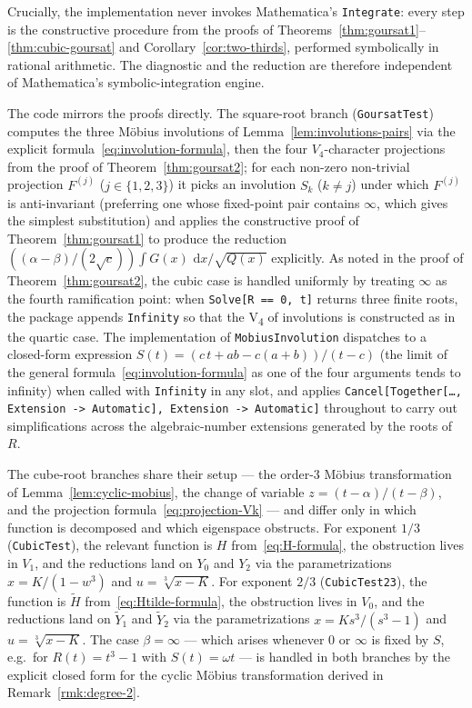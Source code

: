 \documentclass[11pt,a4paper]{article}
\theoremstyle{plain}
\theoremstyle{definition}
\theoremstyle{remark}
\renewcommand{\d}{\,\mathrm{d}}
\begin{document}
Crucially, the implementation never invokes Mathematica's \texttt{Integrate}: every step is the constructive procedure from the proofs of Theorems~\ref{thm:goursat1}--\ref{thm:cubic-goursat} and Corollary~\ref{cor:two-thirds}, performed symbolically in rational arithmetic. The diagnostic and the reduction are therefore independent of Mathematica's symbolic-integration engine.

The code mirrors the proofs directly. The square-root branch (\texttt{GoursatTest}) computes the three M\"obius involutions of Lemma~\ref{lem:involutions-pairs} via the explicit formula~\eqref{eq:involution-formula}, then the four $V_4$-character projections from the proof of Theorem~\ref{thm:goursat2}; for each non-zero non-trivial projection $F^{(j)}$ ($j\in\{1,2,3\}$) it picks an involution $S_k$ ($k\neq j$) under which $F^{(j)}$ is anti-invariant (preferring one whose fixed-point pair contains $\infty$, which gives the simplest substitution) and applies the constructive proof of Theorem~\ref{thm:goursat1} to produce the reduction $((\alpha-\beta)/(2\sqrt{c}))\int G(x)\,\d x/\sqrt{Q(x)}$ explicitly. As noted in the proof of Theorem~\ref{thm:goursat2}, the cubic case is handled uniformly by treating $\infty$ as the fourth ramification point: when \texttt{Solve[R == 0, t]} returns three finite roots, the package appends \texttt{Infinity} so that the V\textsubscript{4} of involutions is constructed as in the quartic case. The implementation of \texttt{MobiusInvolution} dispatches to a closed-form expression $S(t) = (c\,t + ab - c(a+b))/(t-c)$ (the limit of the general formula~\eqref{eq:involution-formula} as one of the four arguments tends to infinity) when called with \texttt{Infinity} in any slot, and applies \texttt{Cancel[Together[\dots, Extension -> Automatic], Extension -> Automatic]} throughout to carry out simplifications across the algebraic-number extensions generated by the roots of $R$.

The cube-root branches share their setup --- the order-$3$ M\"obius transformation of Lemma~\ref{lem:cyclic-mobius}, the change of variable $z=(t-\alpha)/(t-\beta)$, and the projection formula~\eqref{eq:projection-Vk} --- and differ only in which function is decomposed and which eigenspace obstructs. For exponent $1/3$ (\texttt{CubicTest}), the relevant function is $H$ from~\eqref{eq:H-formula}, the obstruction lives in $V_1$, and the reductions land on $Y_0$ and $Y_2$ via the parametrizations $x=K/(1-w^3)$ and $u=\sqrt[3]{x-K}$. For exponent $2/3$ (\texttt{CubicTest23}), the function is $\widetilde H$ from~\eqref{eq:Htilde-formula}, the obstruction lives in $V_0$, and the reductions land on $\widetilde Y_1$ and $\widetilde Y_2$ via the parametrizations $x=Ks^3/(s^3-1)$ and $u=\sqrt[3]{x-K}$. The case $\beta=\infty$ --- which arises whenever $0$ or $\infty$ is fixed by $S$, e.g.\ for $R(t)=t^3-1$ with $S(t)=\omega t$ --- is handled in both branches by the explicit closed form for the cyclic M\"obius transformation derived in Remark~\ref{rmk:degree-2}.
\end{document}
